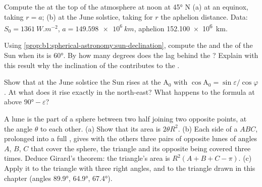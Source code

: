 \begin{exercise}[$\star\star$]\label{exo:b1:spherical-astronomy:9}
Compute the  at the top of the atmosphere at noon at 
\ang{45} N (a) at an equinox, taking $r = a$; (b) at the June solstice,
taking for $r$ the aphelion distance. Data: $S_0 = \qty{1361}{W.m^{-2}}$,
$a = \qty{149.598e6}{km}$, aphelion \qty{152.100e6}{km}.
\end{exercise}

\begin{exercise}[$\star\star\star$]\label{exo:b1:spherical-astronomy:10}
Using \cref{prop:b1:spherical-astronomy:sun-declination}, compute the
 and the  of the Sun when its  
is \ang{60}. By how many degrees does the  lag behind the
? Explain with this result why the inclination of the 
contributes to the .
\end{exercise}

\begin{exercise}[$\star\star\star$]\label{exo:b1:spherical-astronomy:11}
Show that at the June solstice the Sun rises at the  $\mathrm{A}_0$
with $\cos\mathrm{A}_0 = \sin\varepsilon/\cos\varphi$. At what  does
it rise exactly in the north-east? What happens to the formula at 
above $\ang{90} - \varepsilon$?
\end{exercise}

\begin{exercise}[$\star\star\star$]\label{exo:b1:spherical-astronomy:12}
A lune is the part of a sphere between two half  joining two
opposite points, at the angle $\theta$ to each other. (a) Show that its area
is $2\theta R^2$. (b) Each side of a  $ABC$, prolonged into
a full , gives with the others three pairs of opposite lunes of
angles $A$, $B$, $C$ that cover the sphere, the triangle and its opposite
being covered three times. Deduce Girard's theorem: the triangle's area is
$R^2(A + B + C - \pi)$. (c) Apply it to the triangle with three right angles,
and to the triangle drawn in this chapter (angles \ang{89.9}, \ang{64.9},
\ang{67.4}).
\end{exercise}

